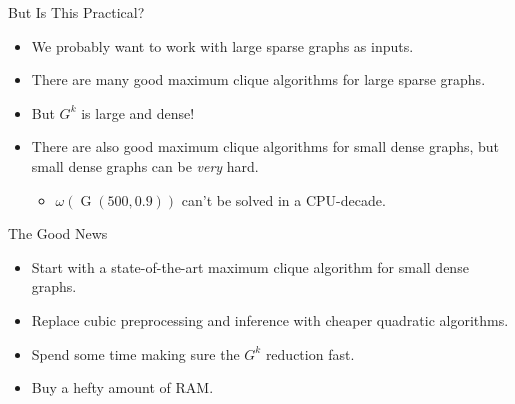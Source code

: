 \documentclass{beamer}
\begin{document}
\begin{frame}{But Is This Practical?}
    \begin{itemize}
        \item We probably want to work with large sparse graphs as inputs.
        \item There are many good maximum clique algorithms for large sparse graphs.
        \item But $G^k$ is large and dense!
        \item There are also good maximum clique algorithms for small dense graphs, but small dense
            graphs can be \emph{very} hard.
            \begin{itemize}
                \item $\omega(\operatorname{G}(500, 0.9))$ can't be solved in a CPU-decade.
            \end{itemize}
    \end{itemize}
\end{frame}

\begin{frame}{The Good News}
    \begin{itemize}
        \item Start with a state-of-the-art maximum clique algorithm for small dense graphs.
        \item Replace cubic preprocessing and inference with cheaper quadratic algorithms.
        \item Spend some time making sure the $G^k$ reduction fast.
        \item Buy a hefty amount of RAM.
    \end{itemize}
\end{frame}
\end{document}
